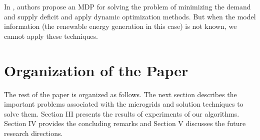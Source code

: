 In \cite{goodmdp}, authors propose an MDP for solving the problem of minimizing the demand and supply deficit  
and apply dynamic optimization methods. But when the model information (the renewable energy generation in this case) is not known, we cannot apply these techniques.

\section*{Organization of the Paper}	
The rest of the paper is organized as follows. The next section describes the important problems associated with the microgrids and solution techniques to solve them. Section III presents the results of experiments of our algorithms. Section IV provides the concluding remarks and Section V discusses the future research directions.